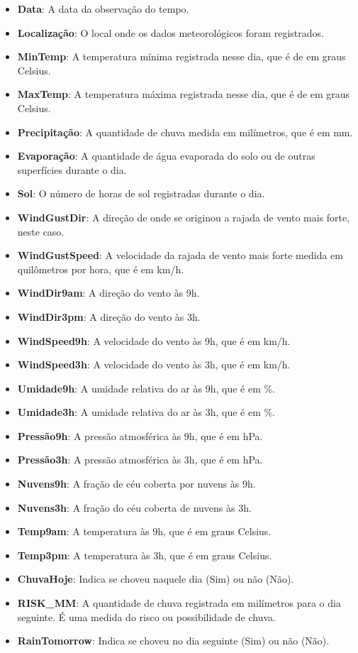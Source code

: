 \documentclass{article}
\begin{document}
\begin{itemize}
  \item \textbf{Data}: A data da observação do tempo.
  \item \textbf{Localização}: O local onde os dados meteorológicos foram registrados.
  \item \textbf{MinTemp}: A temperatura mínima registrada nesse dia, que é de em graus Celsius.
  \item \textbf{MaxTemp}: A temperatura máxima registrada nesse dia, que é de em graus Celsius.
  \item \textbf{Precipitação}: A quantidade de chuva medida em milímetros, que é em mm.
  \item \textbf{Evaporação}: A quantidade de água evaporada do solo ou de outras superfícies durante o dia.
  \item \textbf{Sol}: O número de horas de sol registradas durante o dia.
  \item \textbf{WindGustDir}: A direção de onde se originou a rajada de vento mais forte, neste caso.
  \item \textbf{WindGustSpeed}: A velocidade da rajada de vento mais forte medida em quilômetros por hora, que é em km/h.
  \item \textbf{WindDir9am}: A direção do vento às 9h.
  \item \textbf{WindDir3pm}: A direção do vento às 3h.
  \item \textbf{WindSpeed9h}: A velocidade do vento às 9h, que é em km/h.
  \item \textbf{WindSpeed3h}: A velocidade do vento às 3h, que é em km/h.
  \item \textbf{Umidade9h}: A umidade relativa do ar às 9h, que é em \%.
  \item \textbf{Umidade3h}: A umidade relativa do ar às 3h, que é em \%.
  \item \textbf{Pressão9h}: A pressão atmosférica às 9h, que é em hPa.
  \item \textbf{Pressão3h}: A pressão atmosférica às 3h, que é em hPa.
  \item \textbf{Nuvens9h}: A fração de céu coberta por nuvens às 9h.
  \item \textbf{Nuvens3h}: A fração do céu coberta de nuvens às 3h.
  \item \textbf{Temp9am}: A temperatura às 9h, que é em graus Celsius.
  \item \textbf{Temp3pm}: A temperatura às 3h, que é em graus Celsius.
  \item \textbf{ChuvaHoje}: Indica se choveu naquele dia (Sim) ou não (Não).
  \item \textbf{RISK\_MM}: A quantidade de chuva registrada em milímetros para o dia seguinte. É uma medida do risco ou possibilidade de chuva.
  \item \textbf{RainTomorrow}: Indica se choveu no dia seguinte (Sim) ou não (Não).
\end{itemize}
\end{document}
